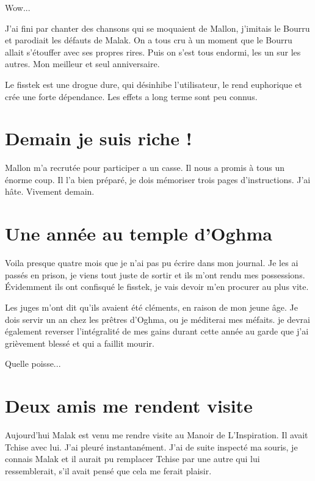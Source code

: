 \documentclass[10pt,a4paper,twoside,twocolumn,openany]{book}
\begin{document}
Wow...

J'ai fini par chanter des chansons qui se moquaient de Mallon, j'imitais le Bourru et parodiait
les défauts de Malak. On a tous cru à un moment que le Bourru allait s'étouffer avec ses propres rires.
Puis on s'est tous endormi, les un sur les autres. Mon meilleur et seul anniversaire.

\begin{quotebox}
Le fisstek est une drogue dure, qui désinhibe l'utilisateur, le rend euphorique et crée une forte dépendance.
Les effets a long terme sont peu connus.
\end{quotebox}

\section{Demain je suis riche !}

Mallon m'a recrutée pour participer a un casse. Il nous a promis à tous un énorme coup. Il l'a bien 
préparé, je dois mémoriser trois pages d'instructions. J'ai hâte. Vivement demain.

\section{Une année au temple d'Oghma}

Voila presque quatre mois que je n'ai pas pu écrire dans mon journal. Je les ai
passés en prison, je viens tout juste de sortir et ils m'ont rendu mes possessions.
Évidemment ils ont confisqué le fisstek, je vais devoir m'en procurer au plus vite.
 
Les juges m'ont dit qu'ils avaient été cléments, en raison de mon jeune âge. Je dois servir un an
chez les prêtres d'Oghma, ou je méditerai mes méfaits. je devrai également reverser l'intégralité 
de mes gains durant cette année au garde que j'ai grièvement blessé et qui a faillit mourir.

Quelle poisse...

\section{Deux amis me rendent visite}

Aujourd'hui Malak est venu me rendre visite au Manoir de L'Inspiration.
Il avait Tchise avec lui. J'ai pleuré instantanément.
J'ai de suite inspecté ma souris, je connais Malak et il aurait pu remplacer Tchise par une autre
qui lui ressemblerait, s'il avait pensé que cela me ferait plaisir. 
\end{document}
